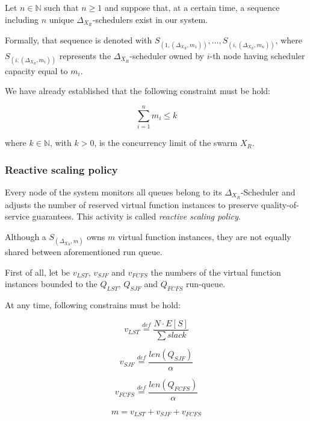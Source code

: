 \documentclass[10pt,a4paper]{article}
\newcommand{\mathDef}{\overset{\textit{def}}{=}}
\theoremstyle{definition}
\begin{document}
Let $n \in \mathbb{N}$ such that $n \geq 1$ and suppose that, at a certain time, a sequence including $n$ unique $\Delta_{X_{R}}$-schedulers exist in our system.

Formally, that sequence is denoted with $S_{(1,(\Delta_{X_{R}},m_1))}, \ldots , S_{(i,(\Delta_{X_{R}},m_n))}$, where $S_{(i,(\Delta_{X_{R}},m_i))}$ represents the $\Delta_{X_{R}}$-scheduler owned by $i$-th node having scheduler capacity equal to $m_i$.

We have already established that the following constraint must be hold:

\begin{equation}
\label{eqn:SchedulerConstrains}
\sum_{i=1}^{n} m_i \leq k
\end{equation}

where $k \in \mathbb{N}$, with $k > 0$, is the concurrency limit of the swarm $X_R$.


\subsubsection{Reactive scaling policy}

Every node of the system monitors all queues belong to its $\Delta_{X_{R}}$-Scheduler and adjusts the number of reserved virtual function instances to preserve quality-of-service guarantees. This activity is called \textit{reactive scaling policy}.

Although a $S_{(\Delta_{X_{R}},m)}$ owns $m$ virtual function instances, they are not equally shared between aforementioned run queue. 

First of all, let be $v_{LST}$, $v_{SJF}$ and $v_{FCFS}$ the numbers of the virtual function instances bounded to the $Q_{LST}$, $Q_{SJF}$ and $Q_{FCFS}$ run-queue. 

At any time, following constrains must be hold:

\begin{equation}
v_{LST} \mathDef \dfrac{N \cdot E[S]}{\sum slack} 
\end{equation}

\begin{equation}
v_{SJF} \mathDef \dfrac{len(Q_{SJF})}{\alpha} 
\end{equation}

\begin{equation}
v_{FCFS} \mathDef \dfrac{len(Q_{FCFS})}{\alpha} 
\end{equation}

\begin{equation}
m = v_{LST} + v_{SJF} + v_{FCFS}
\end{equation}
\end{document}
